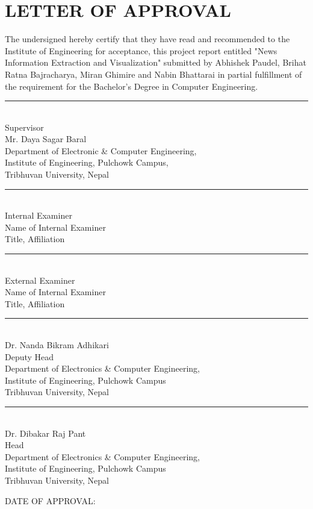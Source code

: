 
\newpage
\section*{LETTER OF APPROVAL}
\setcounter{page}{2}
The undersigned hereby certify that they have read and recommended to the Institute of Engineering for acceptance, this project
report entitled "News Information Extraction and Visualization" submitted by Abhishek Paudel, Brihat Ratna Bajracharya, Miran Ghimire and Nabin Bhattarai in partial fulfillment of the requirement for the Bachelor's Degree in Computer Engineering. 

\vfill
\begin{minipage}{.56\textwidth}
\rule{0.6\textwidth}{0.8pt}\\
Supervisor \\ 
Mr. Daya Sagar Baral \\ 
{Department of Electronic \& Computer Engineering,} \\
Institute of Engineering, Pulchowk Campus, \\
Tribhuvan University, Nepal
\end{minipage}

\vfill
\begin{minipage}{.5\textwidth}
\rule{.66\textwidth}{0.8pt} \\
Internal Examiner \\ 
Name of Internal Examiner \\
Title, Affiliation 
\end{minipage}
\begin{minipage}{.5\textwidth}
\rule{.66\textwidth}{0.8pt} \\ 
External Examiner \\ 
Name of Internal Examiner \\ 
Title, Affiliation 
\end{minipage}
\vfill
\begin{minipage}{.53\textwidth}
\rule{.6\textwidth}{0.8pt}\\
Dr. Nanda Bikram Adhikari \\ 
Deputy Head  \\ 
    {\small Department of Electronics \& Computer Engineering,} \\ 
Institute of Engineering, Pulchowk Campus \\
Tribhuvan University, Nepal \\ 
\end{minipage}
\begin{minipage}{.53\textwidth}
\rule{.6\textwidth}{0.8pt}\\
Dr. Dibakar Raj Pant \\ 
Head  \\ 
    {\small Department of Electronics \& Computer Engineering,} \\ 
Institute of Engineering, Pulchowk Campus \\ 
Tribhuvan University, Nepal \\
\end{minipage}

\vfill
DATE OF APPROVAL:
\vfill
